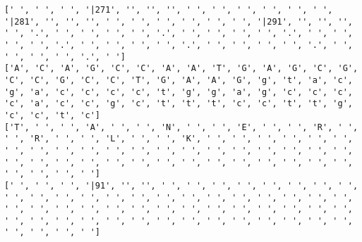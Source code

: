 \documentclass{article}
\begin{document}
\begin{Verbatim}
[' ', ' ', ' ', '|271', '', '', '', ' ', ' ', ' ', ' ', ' ', ' ', '|281', '', '', '', ' ', ' ', ' ', ' ', ' ', ' ', '|291', '', '', '', ' ', '.', ' ', ' ', ' ', ' ', '.', ' ', ' ', ' ', ' ', '.', ' ', ' ', ' ', ' ', '.', ' ', ' ', ' ', ' ', '.', ' ', ' ', ' ', ' ', '.', ' ', ' ', ' ', ' ', '.', ' ']
['A', 'C', 'A', 'G', 'C', 'C', 'A', 'A', 'T', 'G', 'A', 'G', 'C', 'G', 'C', 'C', 'G', 'C', 'C', 'T', 'G', 'A', 'A', 'G', 'g', 't', 'a', 'c', 'g', 'a', 'c', 'c', 'c', 'c', 't', 'g', 'g', 'a', 'g', 'c', 'c', 'c', 'c', 'a', 'c', 'c', 'g', 'c', 't', 't', 't', 'c', 'c', 't', 't', 'g', 'c', 'c', 't', 'c']
['T', ' ', ' ', 'A', ' ', ' ', 'N', ' ', ' ', 'E', ' ', ' ', 'R', ' ', ' ', 'R', ' ', ' ', 'L', ' ', ' ', 'K', ' ', ' ', ' ', ' ', ' ', ' ', ' ', ' ', ' ', ' ', ' ', ' ', ' ', ' ', ' ', ' ', ' ', ' ', ' ', ' ', ' ', ' ', ' ', ' ', ' ', ' ', ' ', ' ', ' ', ' ', ' ', ' ', ' ', ' ', ' ', ' ', ' ', ' ']
[' ', ' ', ' ', '|91', '', '', ' ', ' ', ' ', ' ', ' ', ' ', ' ', ' ', ' ', ' ', ' ', ' ', ' ', ' ', ' ', ' ', ' ', ' ', ' ', ' ', ' ', ' ', ' ', ' ', ' ', ' ', ' ', ' ', ' ', ' ', ' ', ' ', ' ', ' ', ' ', ' ', ' ', ' ', ' ', ' ', ' ', ' ', ' ', ' ', ' ', ' ', ' ', ' ', ' ', ' ', ' ', ' ', ' ', ' ']
  

\end{Verbatim}
\end{document}
